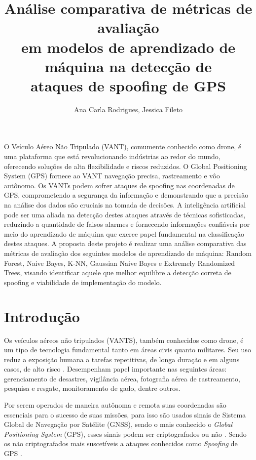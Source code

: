 \documentclass[12pt]{article}
\title{Análise comparativa de métricas de avaliação\\
em modelos de aprendizado de máquina na detecção de\\
ataques de spoofing de GPS
}
\author{Ana Carla Rodrigues\inst{1}, Jessica Fileto\inst{1}}
\begin{document}
\maketitle
     
\begin{resumo} 
O Veículo Aéreo Não Tripulado (VANT), comumente conhecido como drone, é uma
plataforma que está revolucionando indústrias ao redor do mundo, oferecendo 
soluções de alta flexibilidade e riscos reduzidos. O Global Positioning System 
(GPS) fornece ao VANT navegação precisa, rastreamento e vôo autônomo. Os VANTs 
podem sofrer ataques de spoofing nas coordenadas de GPS, comprometendo a 
segurança da informação e demonstrando que a precisão na análise dos dados são 
cruciais na tomada de decisões. A inteligência artificial pode ser uma aliada 
na detecção destes ataques através de técnicas sofisticadas, reduzindo a 
quantidade de falsos alarmes e fornecendo informações confiáveis por meio do 
aprendizado de máquina que exerce papel fundamental na classificação destes 
ataques. A proposta deste projeto é realizar uma análise comparativa das 
métricas de avaliação dos seguintes modelos de aprendizado de máquina: Random 
Forest, Naive Bayes, K-NN, Gaussian Naive Bayes e Extremely Randomized Trees, visando identificar 
aquele que melhor equilibre a detecção correta de spoofing e viabilidade de 
implementação do modelo.
\end{resumo}

\section{Introdução}

Os veículos aéreos não tripulados (VANTS), também conhecidos como drone,
é um tipo de tecnologia fundamental tanto em áreas civis quanto militares.
Seu uso reduz a exposição humana a tarefas repetitivas, de longa duração e em alguns casos, de alto risco \cite{dialogos}.
Desempenham papel importante nas seguintes áreas: gerenciamento de desastres, vigilância aérea, fotografia aérea de rastreamento, pesquisa e resgate,
monitoramento de gado, dentre outros. \cite{titounaLightweightSecurityTechnique2021} 

Por serem operados de maneira autônoma e remota suas coordenadas são essenciais
para o sucesso de suas missões, para isso são usados sinais de Sistema Global de Navegação por Satélite (GNSS),
sendo o mais conhecido o \textit{Global Positioning System} (GPS), esses sinais podem ser criptografados ou não
\cite {lester}. Sendo os não criptografados mais suscetíveis a ataques conhecidos como \textit{Spoofing} de GPS \cite{srinivasansGPSSpoofingDetection2023}. 
\end{document}
